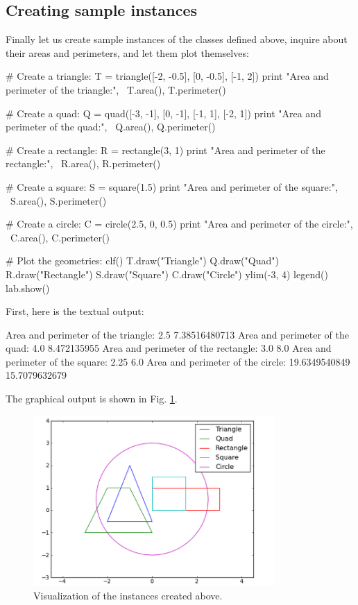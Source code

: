 \subsection{Creating sample instances}

Finally let us create sample instances of the classes defined above, inquire
about their areas and perimeters, and let them plot themselves:

\begin{bluecode}
# Create a triangle:
T = triangle([-2, -0.5], [0, -0.5], [-1, 2])
print "Area and perimeter of the triangle:", \
T.area(), T.perimeter()

# Create a quad:
Q = quad([-3, -1], [0, -1], [-1, 1], [-2, 1])
print "Area and perimeter of the quad:", \
Q.area(), Q.perimeter()
 
# Create a rectangle:
R = rectangle(3, 1)
print "Area and perimeter of the rectangle:", \
R.area(), R.perimeter()

# Create a square:
S = square(1.5)
print "Area and perimeter of the square:", \
S.area(), S.perimeter()
 
# Create a circle:
C = circle(2.5, 0, 0.5)
print "Area and perimeter of the circle:", \
C.area(), C.perimeter()

# Plot the geometries:
clf()
T.draw("Triangle")
Q.draw("Quad")
R.draw("Rectangle")
S.draw("Square")
C.draw("Circle")
ylim(-3, 4)
legend()
lab.show()
\end{bluecode}
First, here is the textual output:

\begin{bluecode}
Area and perimeter of the triangle: 2.5 7.38516480713
Area and perimeter of the quad: 4.0 8.472135955
Area and perimeter of the rectangle: 3.0 8.0
Area and perimeter of the square: 2.25 6.0
Area and perimeter of the circle: 19.6349540849 15.7079632679
\end{bluecode}
The graphical output is shown in Fig. \ref{fig:classes2}.

\begin{figure}[!ht]
\begin{center}
\includegraphics[width=0.82\textwidth]{imgp/classes2.png}
\end{center}
\vspace{-2mm}
\caption{Visualization of the instances created above.}
\label{fig:classes2}
\end{figure}

